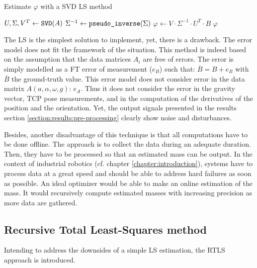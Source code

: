 \documentclass[/home/francois/latex/report/main.tex]{subfiles}
\begin{document}
\begin{algorithm}
\caption{Estimate $\varphi$ with a \ac{SVD} \ac{LS} method \label{alg:background:svd-ls}}
\begin{algorithmic}
\STATE $U, \Sigma, V^T \leftarrow \text{\texttt{SVD}}(A)$
\STATE $\Sigma^{-1} \leftarrow \text{\texttt{pseudo\_inverse}}(\Sigma)$
\STATE $\varphi \leftarrow V \cdot \Sigma^{-1} \cdot U^T \cdot B$
\RETURN $\varphi$
\end{algorithmic}
\end{algorithm}

The \ac{LS} is the simplest solution to implement, yet, there is a drawback. The error model does not fit the framework of the situation. This method is indeed based on the assumption that the data matrices $A_i$ are free of errors. The error is simply modelled as a \ac{FT} error of measurement ($e_B$) such that: $\overline{B} = B + e_B$ with $\overline{B}$ the ground-truth value. This error model does not consider error in the data matrix $A(a, \alpha, \omega, g)$: $e_A$. Thus it does not consider the error in the gravity vector, \ac{TCP} pose measurements, and in the computation of the derivatives of the position and the orientation. Yet, the output signals presented in the results section \ref{section:results:pre-processing} clearly show noise and disturbances.

Besides, another disadvantage of this technique is that all computations have to be done offline. The approach is to collect the data during an adequate duration. Then, they have to be processed so that an estimated mass can be output. In the context of industrial robotics (cf. chapter \ref{chapter:introduction}), systems have to process data at a great speed and should be able to address hard failures as soon as possible. An ideal optimizer would be able to make an online estimation of the mass. It would recursively compute estimated masses with increasing precision as more data are gathered.

\subsection{Recursive Total Least-Squares method}

Intending to address the downsides of a simple \ac{LS} estimation, the \ac{RTLS} approach is introduced.
\end{document}
